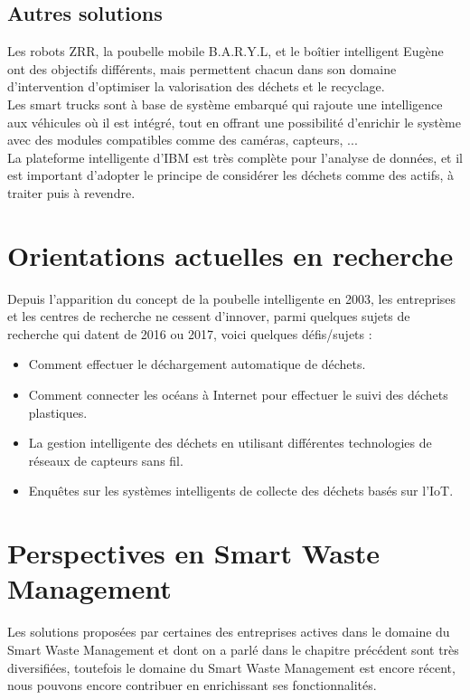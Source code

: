 \documentclass[a4paper,12pt]{report}
\begin{document}
\subsection{Autres solutions}
Les robots ZRR, la poubelle mobile B.A.R.Y.L, et le boîtier intelligent Eugène ont des objectifs différents, mais permettent chacun dans son domaine d'intervention d'optimiser la valorisation des déchets et le recyclage.\\
Les smart trucks sont à base de système embarqué qui rajoute une intelligence aux véhicules où il est intégré, tout en offrant une possibilité d'enrichir le système avec des modules compatibles comme des caméras, capteurs, ...\\
La plateforme intelligente d'IBM est très complète pour l'analyse de données, et il est important d'adopter le principe de considérer les déchets comme des actifs, à traiter puis à revendre.



\section{Orientations actuelles en recherche}
Depuis l'apparition du concept de la poubelle intelligente en 2003, les entreprises et les centres de recherche ne cessent d'innover, parmi quelques sujets de recherche qui datent de 2016 ou 2017, voici quelques défis/sujets :
\begin{itemize}
\item Comment effectuer le déchargement automatique de déchets.
\item Comment connecter les océans à Internet pour effectuer le suivi des déchets plastiques.
\item La gestion intelligente des déchets en utilisant différentes technologies de réseaux de capteurs sans fil.
\item Enquêtes sur les systèmes intelligents de collecte des déchets basés sur l'IoT.
 
\end{itemize}
\section{Perspectives en Smart Waste Management}
Les solutions proposées par certaines des entreprises actives dans le domaine du Smart Waste Management et dont on a parlé dans le chapitre précédent sont très diversifiées, toutefois le domaine du Smart Waste Management est encore récent, nous pouvons encore contribuer en enrichissant ses fonctionnalités. 
\end{document}
